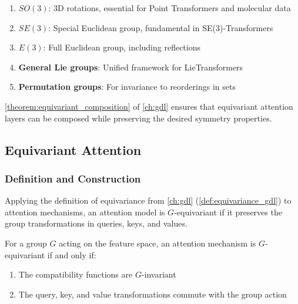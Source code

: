 \begin{enumerate}
    \item \textbf{$SO(3)$}: 3D rotations, essential for Point \glspl{Transformer} and molecular data
    \item \textbf{$SE(3)$}: Special Euclidean group, fundamental in SE(3)-\glspl{Transformer}
    \item \textbf{$E(3)$}: Full Euclidean group, including reflections
    \item \textbf{General Lie groups}: Unified framework for Lie\glspl{Transformer}
    \item \textbf{Permutation groups}: For invariance to reorderings in sets
\end{enumerate}

\autoref{theorem:equivariant_composition} of \autoref{ch:gdl} ensures that equivariant attention layers can be composed while preserving the desired symmetry properties.

\subsection{Equivariant Attention}\label{subsec:equivariant_attention}\label{sec:equivariant_attention}

\subsubsection{Definition and Construction}

Applying the definition of equivariance from \autoref{ch:gdl} (\autoref{def:equivariance_gdl}) to attention mechanisms, an attention model is $G$-equivariant if it preserves the group transformations in queries, keys, and values.

\begin{theorem}
    For a group $G$ acting on the feature space, an attention mechanism is $G$-equivariant if and only if:
    \begin{enumerate}
        \item The compatibility functions are $G$-invariant
        \item The query, key, and value transformations commute with the group action
    \end{enumerate}
\end{theorem}

